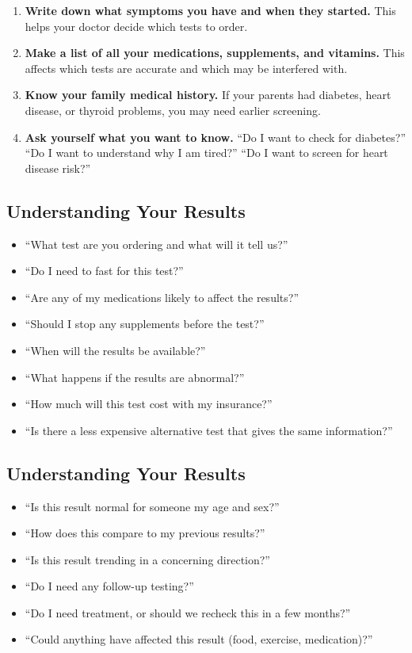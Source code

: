 \begin{enumerate}
    \item \textbf{Write down what symptoms you have and when they started.} This helps your doctor decide which tests to order.
    \item \textbf{Make a list of all your medications, supplements, and vitamins.} This affects which tests are accurate and which may be interfered with.
    \item \textbf{Know your family medical history.} If your parents had diabetes, heart disease, or thyroid problems, you may need earlier screening.
    \item \textbf{Ask yourself what you want to know.} ``Do I want to check for diabetes?'' ``Do I want to understand why I am tired?'' ``Do I want to screen for heart disease risk?''
\end{enumerate}

\subsection{Understanding Your Results}

\begin{itemize}
    \item ``What test are you ordering and what will it tell us?''
    \item ``Do I need to fast for this test?''
    \item ``Are any of my medications likely to affect the results?''
    \item ``Should I stop any supplements before the test?''
    \item ``When will the results be available?''
    \item ``What happens if the results are abnormal?''
    \item ``How much will this test cost with my insurance?''
    \item ``Is there a less expensive alternative test that gives the same information?''
\end{itemize}

\subsection{Understanding Your Results}

\begin{itemize}
    \item ``Is this result normal for someone my age and sex?''
    \item ``How does this compare to my previous results?''
    \item ``Is this result trending in a concerning direction?''
    \item ``Do I need any follow-up testing?''
    \item ``Do I need treatment, or should we recheck this in a few months?''
    \item ``Could anything have affected this result (food, exercise, medication)?''
\end{itemize}

